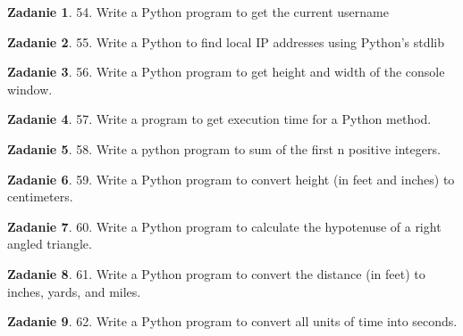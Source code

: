 \documentclass[11pt]{article}
\theoremstyle{definition}
\newtheorem{zadanie}{Zadanie}
\begin{document}
\begin{zadanie}


54. Write a Python program to get the current username 

\end{zadanie}

\begin{zadanie}


55. Write a Python to find local IP addresses using Python's stdlib 

\end{zadanie}

\begin{zadanie}


56. Write a Python program to get height and width of the console window. 

\end{zadanie}

\begin{zadanie}


57. Write a program to get execution time for a Python method. 

\end{zadanie}

\begin{zadanie}


58. Write a python program to sum of the first n positive integers. 

\end{zadanie}

\begin{zadanie}


59. Write a Python program to convert height (in feet and inches) to centimeters. 

\end{zadanie}

\begin{zadanie}


60. Write a Python program to calculate the hypotenuse of a right angled triangle. 

\end{zadanie}

\begin{zadanie}


61. Write a Python program to convert the distance (in feet) to inches, yards, and miles. 

\end{zadanie}

\begin{zadanie}


62. Write a Python program to convert all units of time into seconds. 

\end{zadanie}
\end{document}
